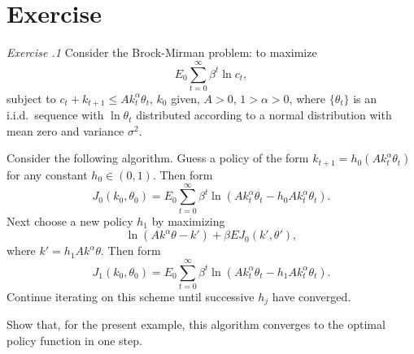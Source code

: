 
\showchaptIDfalse
\showsectIDfalse
\section{Exercise}
\showchaptIDtrue
\showsectIDtrue
\medskip\noindent
{\it Exercise \the\chapternum.1}  
\medskip\noindent
Consider the Brock-Mirman problem: to maximize
$$E_0\sum_{t=0}^\infty \beta^t \ln c_t,$$
subject to $c_t+ k_{t+1} \leq Ak_t^\alpha\theta_t$, $k_0$ given,
 $A>0$, $1>\alpha>0$, where
$\{\theta_t\}$ is an i.i.d.\ sequence with $\ln\theta_t$
distributed according to a
normal distribution with mean zero and variance $\sigma^2$.

Consider the following algorithm.  Guess  a policy of the form
$k_{t+1}=h_0(Ak_t^\alpha \theta_t)$ for any constant $h_0\in(0,1)$.  Then form
$$J_0(k_0,\theta_0) =E_0\sum_{t=0}^\infty \beta^t \ln (Ak_t^\alpha \theta_t-h_0
 Ak_t^\alpha
\theta_t).$$
Next choose a new policy $h_1$ by maximizing
$$\ln (Ak^\alpha \theta-k') +\beta E J_0(k',\theta'),$$
where $k'=h_1Ak^\alpha\theta$.  Then form
$$J_1(k_0,\theta_0) =E_0\sum_{t=0}^\infty \beta^t \ln (Ak_t^\alpha \theta_t
-h_1Ak_t^\alpha
\theta_t).$$
Continue iterating on this scheme until successive $h_j$ have converged.

Show that, for the present example, this algorithm converges to the optimal
policy function in one step.
